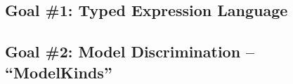 \documentclass{beamer}
\begin{document}
\subsection{Goal \#1: Typed Expression Language}




\subsection{Goal \#2: Model Discrimination -- ``ModelKinds''}

\end{document}
